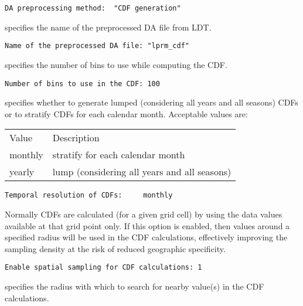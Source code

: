  

 \begin{Verbatim}[frame=single]
DA preprocessing method:  "CDF generation"
 \end{Verbatim}

 
 specifies the name of the preprocessed DA file from LDT. 
 

 \begin{Verbatim}[frame=single]
Name of the preprocessed DA file: "lprm_cdf"
 \end{Verbatim}

 
 specifies the number of bins to use while computing the CDF.
 

 \begin{Verbatim}[frame=single]
Number of bins to use in the CDF: 100 
 \end{Verbatim}

 
  specifies whether to generate
 lumped (considering all years and all seasons) CDFs or to stratify CDFs
 for each calendar month.
 Acceptable values are:

 \begin{tabular}{ll}
 Value     & Description                                  \\
 monthly   & stratify for each calendar month             \\
 yearly    & lump (considering all years and all seasons) \\
 \end{tabular}
 

 \begin{Verbatim}[frame=single]
Temporal resolution of CDFs:     monthly
 \end{Verbatim}

 
 Normally CDFs are calculated (for a given grid cell) by using 
 the data values available at that grid point only. If this option
 is enabled, then values around a specified radius will be used
 in the CDF calculations, effectively improving the sampling
 density at the risk of reduced geographic specificity. 
 

 \begin{Verbatim}[frame=single]
Enable spatial sampling for CDF calculations: 1
 \end{Verbatim}

 
 specifies the radius with which
 to search for nearby value(s) in the CDF calculations. 
 


